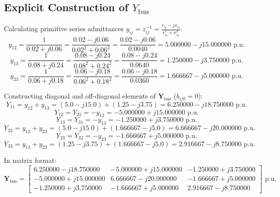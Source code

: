\documentclass[12pt,a4paper,oneside]{report}
\begin{document}
\subsection{Explicit Construction of $Y_{\text{bus}}$}
Calculating primitive series admittances $y_{ij} = z_{ij}^{-1} = \frac{r_{ij} - jx_{ij}}{r_{ij}^2 + x_{ij}^2}$:
\begin{equation}
y_{12} = \frac{1}{0.02 + j0.06} = \frac{0.02 - j0.06}{0.02^2 + 0.06^2} = \frac{0.02 - j0.06}{0.0040} = 5.000000 - j15.000000\text{ p.u.}
\end{equation}
\begin{equation}
y_{13} = \frac{1}{0.08 + j0.24} = \frac{0.08 - j0.24}{0.08^2 + 0.24^2} = \frac{0.08 - j0.24}{0.0640} = 1.250000 - j3.750000\text{ p.u.}
\end{equation}
\begin{equation}
y_{23} = \frac{1}{0.06 + j0.18} = \frac{0.06 - j0.18}{0.06^2 + 0.18^2} = \frac{0.06 - j0.18}{0.0360} = 1.666667 - j5.000000\text{ p.u.}
\end{equation}

Constructing diagonal and off-diagonal elements of $\mathbf{Y}_{\text{bus}}$ ($b_{ij0} = 0$):
\begin{equation}
Y_{11} = y_{12} + y_{13} = (5.0 - j15.0) + (1.25 - j3.75) = 6.250000 - j18.750000\text{ p.u.}
\end{equation}
\begin{equation}
Y_{12} = Y_{21} = -y_{12} = -5.000000 + j15.000000\text{ p.u.}
\end{equation}
\begin{equation}
Y_{13} = Y_{31} = -y_{13} = -1.250000 + j3.750000\text{ p.u.}
\end{equation}
\begin{equation}
Y_{22} = y_{12} + y_{23} = (5.0 - j15.0) + (1.666667 - j5.0) = 6.666667 - j20.000000\text{ p.u.}
\end{equation}
\begin{equation}
Y_{23} = Y_{32} = -y_{23} = -1.666667 + j5.000000\text{ p.u.}
\end{equation}
\begin{equation}
Y_{33} = y_{13} + y_{23} = (1.25 - j3.75) + (1.666667 - j5.0) = 2.916667 - j8.750000\text{ p.u.}
\end{equation}

In matrix format:
\begin{equation}
\mathbf{Y}_{\text{bus}} = \begin{bmatrix}
6.250000 - j18.750000 & -5.000000 + j15.000000 & -1.250000 + j3.750000 \\
-5.000000 + j15.000000 & 6.666667 - j20.000000 & -1.666667 + j5.000000 \\
-1.250000 + j3.750000 & -1.666667 + j5.000000 & 2.916667 - j8.750000
\end{bmatrix}\text{ p.u.}
\end{equation}
\end{document}
